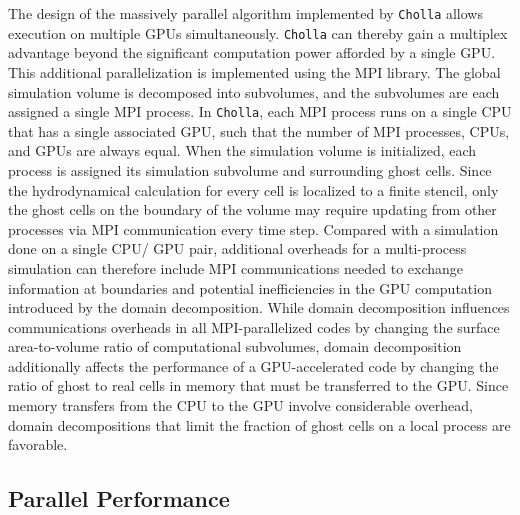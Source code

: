\documentclass[11pt,letterpaper,english]{article}
\begin{document}
The design of the massively parallel algorithm implemented by {\tt Cholla} allows execution on multiple GPUs simultaneously. {\tt Cholla} can thereby gain a multiplex advantage beyond the significant computation power afforded by a single GPU. This additional parallelization is implemented using the MPI library. The global simulation volume is decomposed into subvolumes, and the subvolumes are each assigned a single MPI process. In {\tt Cholla}, each MPI process runs on a single CPU that has a single associated GPU, such that the number of MPI processes, CPUs, and GPUs are always equal. When the simulation volume is initialized, each process is assigned its simulation subvolume and surrounding ghost cells. Since the hydrodynamical calculation for every cell is localized to a finite stencil, only the ghost cells on the boundary of the volume may require updating from other processes via MPI communication every time step. Compared with a simulation done on a single CPU/ GPU pair, additional overheads for a multi-process simulation can therefore include MPI communications needed to exchange information at boundaries and potential inefficiencies in the GPU computation introduced by the domain decomposition. While domain decomposition influences communications overheads in all MPI-parallelized codes by changing the surface area-to-volume ratio of computational subvolumes, domain decomposition additionally affects the performance of a GPU-accelerated code by changing the ratio of ghost to real cells in memory that must be transferred to the GPU. Since memory transfers from the CPU to the GPU involve considerable overhead, domain decompositions that limit the fraction of ghost cells on a local process are favorable.


\vspace{-.25in}
\subsection{Parallel Performance}
\vspace{-.2in}

\end{document}
